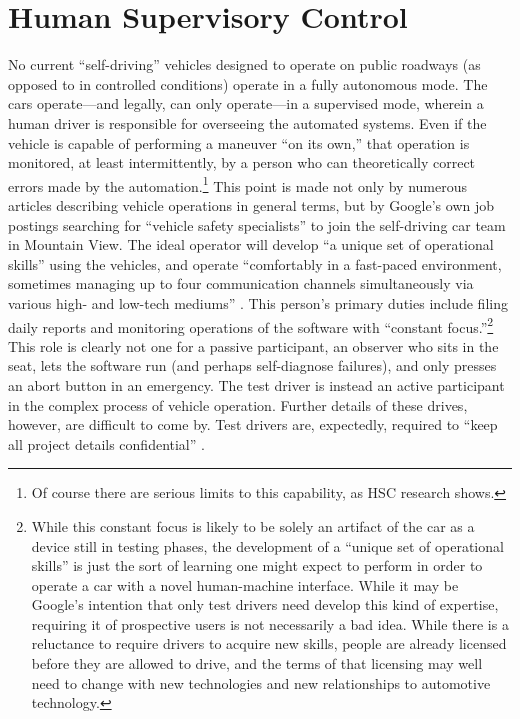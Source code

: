\section{Human Supervisory Control}

No current ``self-driving'' vehicles designed to operate on public
roadways (as opposed to in controlled conditions) operate in a fully
autonomous mode. The cars operate---and legally, can only
operate---in
a supervised mode, wherein a human driver is responsible for
overseeing the automated systems. Even if the vehicle is capable of
performing a maneuver ``on its own,'' that operation is monitored, at
least intermittently, by a person who can theoretically correct errors
made by the automation.\footnote{Of course there are serious
  limits to this capability, as HSC research shows.} This point is made not
only by numerous articles describing vehicle operations in general terms,
but by Google's
own job postings searching for ``vehicle safety specialists'' to join
the self-driving car team in Mountain View. The ideal operator will
develop ``a unique set of operational skills'' using the vehicles, and
operate ``comfortably in a fast-paced environment, sometimes managing
up to four communication channels simultaneously via various high- and
low-tech mediums'' \cite{googleJobPosting}. This person's primary
duties include filing daily reports and monitoring operations of the
software with ``constant focus.''\footnote{While this constant focus
  is likely to be solely an artifact of the car as a device still in
  testing phases, the development of a ``unique set of operational
  skills'' is just the sort of learning one might expect to perform in
order to operate a car with a novel human-machine interface. While it
may be Google's intention that only test drivers need develop this
kind of expertise, requiring it of prospective users is not
necessarily a bad idea. While there is a reluctance to require drivers
to acquire new skills, people are already licensed before they are
allowed to drive, and the terms of that licensing may well need to
change with new technologies and new relationships to automotive
technology.} This role is clearly not one for a passive participant,
an observer who sits in the seat, lets the software run (and perhaps
self-diagnose failures), and only presses an abort button in an
emergency. The test driver is instead an active participant in the
complex process of 
vehicle operation. Further details of these drives, however,
are difficult to come by. Test drivers are, expectedly, required to
``keep all project details confidential'' \cite{googleJobPosting}.

